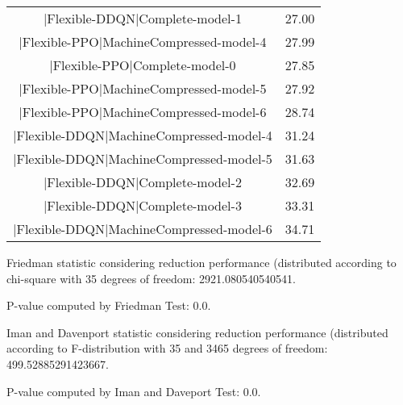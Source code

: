 \documentclass[a3paper,10pt]{article}
\begin{document}
\begin{table}[!htp]
\begin{tabular}{c|c}
|Flexible-DDQN|Complete-model-1&27.00\\
|Flexible-PPO|MachineCompressed-model-4&27.99\\
|Flexible-PPO|Complete-model-0&27.85\\
|Flexible-PPO|MachineCompressed-model-5&27.92\\
|Flexible-PPO|MachineCompressed-model-6&28.74\\
|Flexible-DDQN|MachineCompressed-model-4&31.24\\
|Flexible-DDQN|MachineCompressed-model-5&31.63\\
|Flexible-DDQN|Complete-model-2&32.69\\
|Flexible-DDQN|Complete-model-3&33.31\\
|Flexible-DDQN|MachineCompressed-model-6&34.71\\
\end{tabular}
\end{table}


Friedman statistic considering reduction performance (distributed according to chi-square with 35 degrees of freedom: 2921.080540540541.


P-value computed by Friedman Test: 0.0.\newline

Iman and Davenport statistic considering reduction performance (distributed according to F-distribution with 35 and 3465 degrees of freedom: 499.52885291423667.


P-value computed by Iman and Daveport Test: 0.0.\newline
\end{document}
